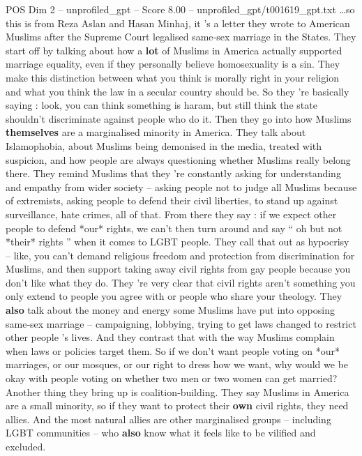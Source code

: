 \begin{textsample}{POS Dim 2 – unprofiled\_gpt – Score 8.00 – unprofiled\_gpt/t001619\_gpt.txt}  \label{ex:f2_pos_025}
…so this is from Reza Aslan and Hasan Minhaj, it ’s a letter they wrote to American Muslims after the Supreme Court legalised same‑sex marriage in the States.
They start off by talking about how a \textbf{lot} of Muslims in America actually supported marriage equality, even if they personally believe homosexuality is a sin.
They make this distinction between what you think is morally right in your religion and what you think the law in a secular country should be.
So they ’re basically saying : look, you can think something is haram, but still think the state shouldn't discriminate against people who do it.
Then they go into how Muslims \textbf{themselves} are a marginalised minority in America.
They talk about Islamophobia, about Muslims being demonised in the media, treated with suspicion, and how people are always questioning whether Muslims really belong there.
They remind Muslims that they ’re constantly asking for understanding and empathy from wider society – asking people not to judge all Muslims because of extremists, asking people to defend their civil liberties, to stand up against surveillance, hate crimes, all of that.
From there they say : if we expect other people to defend *our* rights, we can't then turn around and say “ oh but not *their* rights ” when it comes to LGBT people.
They call that out as hypocrisy – like, you can't demand religious freedom and protection from discrimination for Muslims, and then support taking away civil rights from gay people because you don't like what they do.
They ’re very clear that civil rights aren't something you only extend to people you agree with or people who share your theology.
They \textbf{also} talk about the money and energy some Muslims have put into opposing same‑sex marriage – campaigning, lobbying, trying to get laws changed to restrict other people ’s lives.
And they contrast that with the way Muslims complain when laws or policies target them.
So if we don't want people voting on *our* marriages, or our mosques, or our right to dress how we want, why would we be okay with people voting on whether two men or two women can get married?
Another thing they bring up is coalition‑building.
They say Muslims in America are a small minority, so if they want to protect their \textbf{own} civil rights, they need allies.
And the most natural allies are other marginalised groups – including LGBT communities – who \textbf{also} know what it feels like to be vilified and excluded.

\end{textsample}
